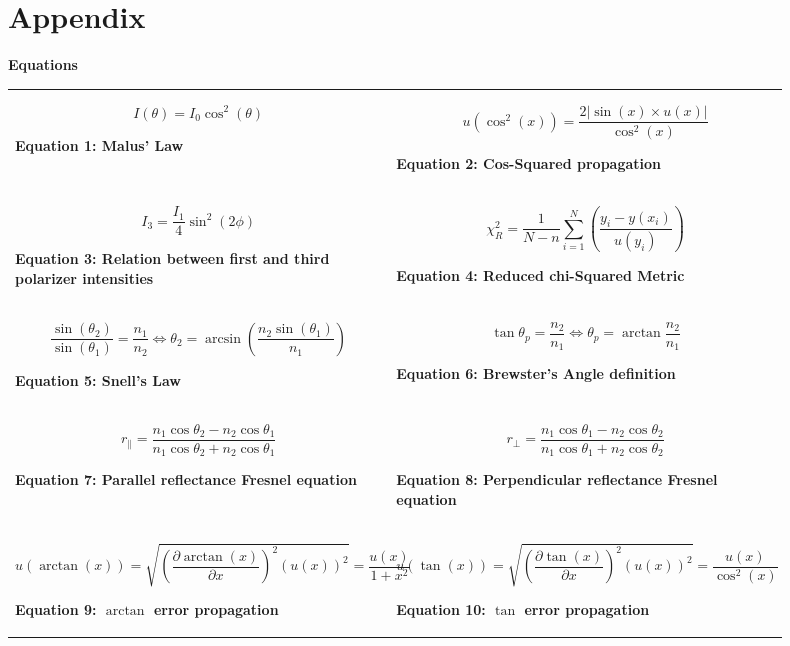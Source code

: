 \documentclass[
	letterpaper, %
	10pt, %
]{CSUniSchoolLabReport}
\begin{document}
\section{Appendix}
{\large\textbf{Equations}}\\
\begin{tabular}{p{0.45\linewidth} p{0.45\linewidth}}
	$$I(\theta) = I_0\cos^2(\theta)$$
	\begin{center}
		\textbf{Equation 1: Malus' Law}
	\end{center}
	&
	$$u(\cos^2(x)) = \frac{2\left|\sin(x) \times u(x)\right|}{\cos^2(x)}$$
	\begin{center}
		\textbf{Equation 2: Cos-Squared propagation}
	\end{center}
	\\
	$$I_3 = \frac{I_1}4\sin^2(2\phi) $$
	\begin{center}
		\textbf{Equation 3: Relation between first and third polarizer intensities}
	\end{center}
	&
	$$\chi^2_R = \frac{1}{N-n}\sum_{i=1}^N\left(\frac{y_i-y(x_i)}{u(y_i)}\right)$$
	\begin{center}
		\textbf{Equation 4: Reduced chi-Squared Metric}
	\end{center}\\
	$$ \frac{\sin(\theta_2)}{\sin(\theta_1)} = \frac{n_1}{n_2} \iff \theta_2 = \arcsin\left(\frac{n_2\sin(\theta_1)}{n_1}\right)  $$
	\begin{center}
		\textbf{Equation 5: Snell's Law}
	\end{center}
	&
	$$\tan\theta_p = \frac{n_2}{n_1} \iff \theta_p = \arctan{\frac{n_2}{n_1}}$$
	\begin{center}
		\textbf{Equation 6: Brewster's Angle definition}
	\end{center}\\

	$$ r_\parallel = \frac{n_1\cos\theta_2 - n_2\cos\theta_1}{n_1\cos\theta_2 + n_2\cos\theta_1}$$
	\begin{center}
		\textbf{Equation 7: Parallel reflectance Fresnel equation}
	\end{center}
	&
	$$r_\perp = \frac{n_1\cos\theta_1 - n_2\cos\theta_2}{n_1\cos\theta_1 + n_2\cos\theta_2}$$
	\begin{center}
		\textbf{Equation 8: Perpendicular reflectance Fresnel equation}
	\end{center}\\

	$$u(\arctan(x)) = \sqrt{\left(\frac{\partial \arctan(x)}{\partial x}\right)^2 \left(u(x)\right)^2} = \frac{u(x)}{1+x^2}$$
	\begin{center}
		\textbf{Equation 9: $\arctan$ error propagation}
	\end{center}
	&
	$$u(\tan(x)) = \sqrt{\left(\frac{\partial \tan(x)}{\partial x}\right)^2 \left(u(x)\right)^2} = \frac{u(x)}{\cos^2(x)}$$
	\begin{center}
		\textbf{Equation 10: $\tan$ error propagation}
	\end{center}\\

\end{tabular}
\end{document}

